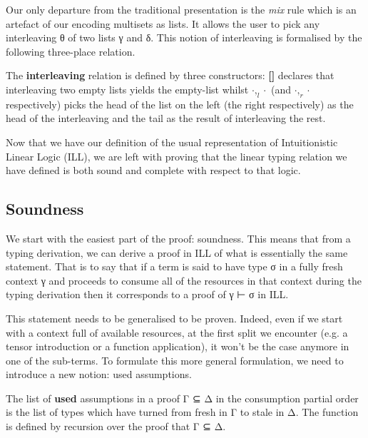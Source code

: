 

Our only departure from the traditional presentation is the \textit{mix}
rule which is an artefact of our encoding multisets as lists. It allows
the user to pick any interleaving θ of two lists γ and δ. This notion of
interleaving is formalised by the following three-place relation.

\begin{definition} The \textbf{interleaving} relation is defined by three
constructors: \textbf{[]} declares that interleaving two empty lists yields
the empty-list whilst \textbf{$\cdot,_{l}\cdot$} (and \textbf{$\cdot,_{r}\cdot$}
respectively) picks the head of the list on the left (the right respectively)
as the head of the interleaving and the tail as the result of interleaving
the rest.

\end{definition}

Now that we have our definition of the usual representation of Intuitionistic
Linear Logic (ILL), we are left with proving that the linear typing relation
we have defined is both sound and complete with respect to that logic.

\subsection{Soundness}

We start with the easiest part of the proof: soundness. This means that from
a typing derivation, we can derive a proof in ILL of what is essentially the
same statement. That is to say that if a term is said to have type σ in a fully
fresh context γ and proceeds to consume all of the resources in that context
during the typing derivation then it corresponds to a proof of γ ⊢ σ in ILL.

This statement needs to be generalised to be proven. Indeed, even if we start
with a context full of available resources, at the first split we encounter
(e.g. a tensor introduction or a function application), it won't be the case
anymore in one of the sub-terms. To formulate this more general formulation,
we need to introduce a new notion: used assumptions.

\begin{definition}The list of \textbf{used} assumptions in a proof Γ ⊆ Δ in
the consumption partial order is the list of types which have turned from
fresh in Γ to stale in Δ. The \used{\cdot} function is defined by recursion
over the proof that Γ ⊆ Δ.
\end{definition}

